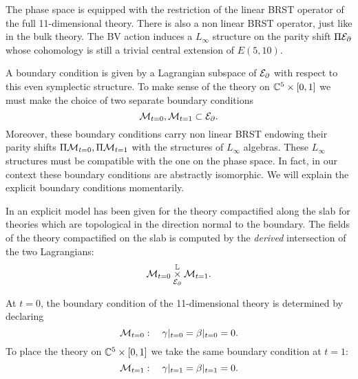 The phase space is equipped with the restriction of the linear BRST operator of the full 11-dimensional theory. 
There is also a non linear BRST operator, just like in the bulk theory.
The BV action induces a $L_\infty$ structure on the parity shift $\Pi\mathcal E_{\partial}$ whose cohomology is still a trivial central extension of $E(5,10)$. 

A boundary condition is given by a Lagrangian subspace of $\mathcal E_{\partial}$ with respect to this even symplectic structure. 
To make sense of the theory on $\mathbb C^5 \times [0,1]$ we must make the choice of two separate boundary conditions 
\[
\mathcal M_{t=0} , \mathcal M_{t=1} \subset \mathcal E_{\partial} .
\]
Moreover, these boundary conditions carry non linear BRST endowing their parity shifts $\Pi \mathcal M_{t=0} , \Pi\mathcal M_{t=1}$ with the structures of $L_\infty$ algebras. 
These $L_\infty$ structures must be compatible with the one on the phase space.
In fact, in our context these boundary conditions are abstractly isomorphic. 
We will explain the explicit boundary conditions momentarily. 

In \cite{?} an explicit model has been given for the theory compactified along the slab for theories which are topological in the direction normal to the boundary.
The fields of the theory compactified on the slab is computed by the {\em derived} intersection of the two Lagrangians:
\[
\mathcal M_{t=0} \overset{\mathbb L}{\underset{\mathcal E_{\partial}}{\times}}\mathcal M_{t=1}.
\]

\parsec[s:boundary]
At $t=0$, the boundary condition of the 11-dimensional theory is determined by declaring 
\[
\mathcal M_{t=0}: \quad \gamma|_{t=0} = \beta|_{t=0} = 0 .
\]
To place the theory on $\mathbb C^5 \times [0,1]$ we take the same boundary condition at $t=1$:
\[
\mathcal M_{t=1}: \quad \gamma|_{t=1} = \beta|_{t=1} = 0 .
\]

